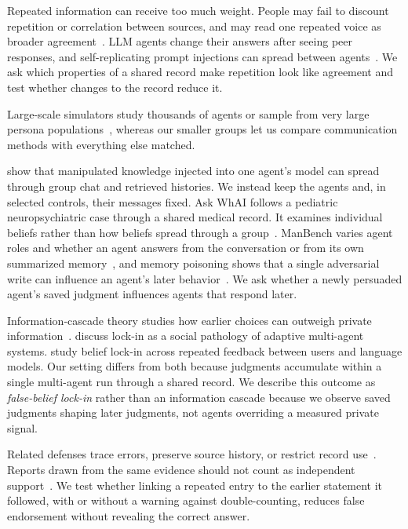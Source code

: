 \documentclass{article} %
\begin{document}
Repeated information can receive too much weight. People may fail to discount repetition or correlation between sources, and may read one repeated voice as broader agreement~\citep{demarzo2003persuasion,enke2019correlation,weaver2007popularity}. LLM agents change their answers after seeing peer responses, and self-replicating prompt injections can spread between agents~\citep{cho2025herd,lee2024prompt}. We ask which properties of a shared record make repetition look like agreement and test whether changes to the record reduce it.

Large-scale simulators study thousands of agents or sample from very large persona populations~\citep{piao2025agentsociety,li2026matraix}, whereas our smaller groups let us compare communication methods with everything else matched.

\citet{ju2026flooding} show that manipulated knowledge injected into one agent's model can spread through group chat and retrieved histories. We instead keep the agents and, in selected controls, their messages fixed. Ask WhAI follows a pediatric neuropsychiatric case through a shared medical record. It examines individual beliefs rather than how beliefs spread through a group~\citep{moore2025askwhai}. ManBench varies agent roles and whether an agent answers from the conversation or from its own summarized memory~\citep{xu2026mandela}, and memory poisoning shows that a single adversarial write can influence an agent's later behavior~\citep{dash2026}. We ask whether a newly persuaded agent's saved judgment influences agents that respond later.

Information-cascade theory studies how earlier choices can outweigh private information~\citep{banerjee1992,anderson1997,bikhchandani1992}. \citet{jensen2002social} discuss lock-in as a social pathology of adaptive multi-agent systems. \citet{qiu2025lockin} study belief lock-in across repeated feedback between users and language models. Our setting differs from both because judgments accumulate within a single multi-agent run through a shared record. We describe this outcome as \emph{false-belief lock-in} rather than an information cascade because we observe saved judgments shaping later judgments, not agents overriding a measured private signal.

Related defenses trace errors, preserve source history, or restrict record use~\citep{li2026argus,xie2026spark,margalit2026,wang2026mapgraph}. Reports drawn from the same evidence should not count as independent support~\citep{bara2026sybil}. We test whether linking a repeated entry to the earlier statement it followed, with or without a warning against double-counting, reduces false endorsement without revealing the correct answer.
\end{document}
